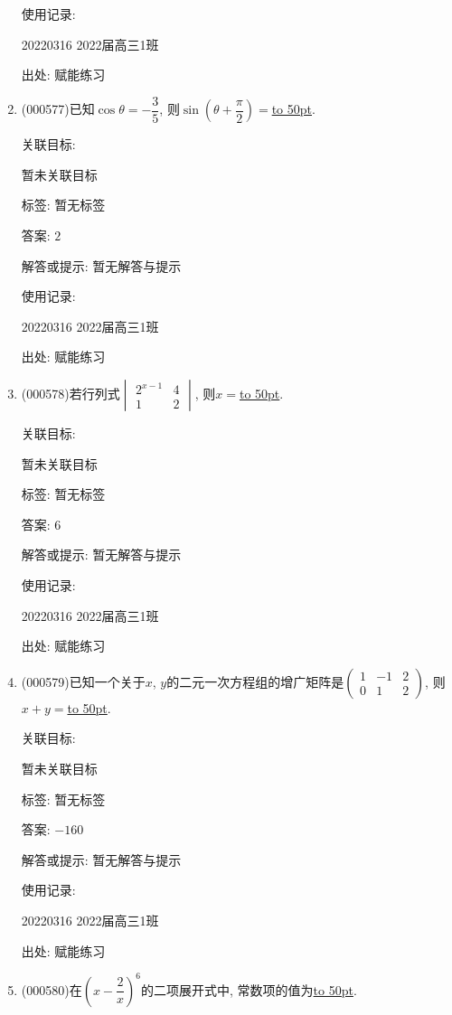 \documentclass[10pt,a4paper]{article}
\newcommand{\blank}[1]{\underline{\hbox to #1pt{}}}
\begin{document}
\begin{enumerate}[1.]
使用记录:

20220316	2022届高三1班	


出处: 赋能练习
\item { (000577)}已知$\cos\theta=-\dfrac35$, 则$\sin(\theta+\dfrac{\pi}2)=$\blank{50}.


关联目标:

暂未关联目标



标签: 暂无标签

答案: $2$

解答或提示: 暂无解答与提示

使用记录:

20220316	2022届高三1班	


出处: 赋能练习
\item { (000578)}若行列式$\begin{vmatrix} 2^{x-1} & 4  \\ 1 & 2 \end{vmatrix}$, 则$x=$\blank{50}.


关联目标:

暂未关联目标



标签: 暂无标签

答案: $6$

解答或提示: 暂无解答与提示

使用记录:

20220316	2022届高三1班	


出处: 赋能练习
\item { (000579)}已知一个关于$x$, $y$的二元一次方程组的增广矩阵是$\begin{pmatrix} 1 & -1 & 2 \\ 0 & 1 & 2 \end{pmatrix}$, 则$x+y=$\blank{50}.


关联目标:

暂未关联目标



标签: 暂无标签

答案: $-160$

解答或提示: 暂无解答与提示

使用记录:

20220316	2022届高三1班	


出处: 赋能练习
\item { (000580)}在$(x-\dfrac2x)^6$的二项展开式中, 常数项的值为\blank{50}.



\end{enumerate}
\end{document}
